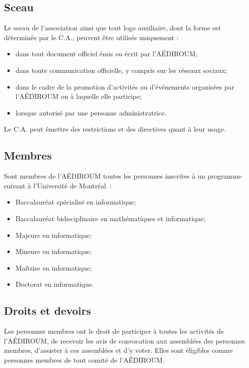 \documentclass{aediroum}
\begin{document}
\subsection{Sceau}\label{sec:sceau}

Le sceau de l'association ainsi que tout logo auxiliaire, dont la forme est déterminée par le C.A., peuvent être utilisés uniquement :

\begin{itemize}
    \item dans tout document officiel émis ou écrit par l'AÉDIROUM;
    \item dans toute communication officielle, y compris sur les réseaux sociaux;
    \item dans le cadre de la promotion d'activités ou d'événements organisées par l'AÉDIROUM ou à laquelle elle participe;
    \item lorsque autorisé par une personne administratrice.
\end{itemize}

Le C.A. peut émettre des restrictions et des directives quant à leur usage.

\subsection{Membres}\label{sec:membres}

Sont membres de l'AÉDIROUM toutes les personnes inscrites à un programme suivant à l'Université de Montréal~:

\begin{itemize}
    \item Baccalauréat spécialisé en informatique;
    \item Baccalauréat bidisciplinaire en mathématiques et informatique;
    \item Majeure en informatique;
    \item Mineure en informatique;
    \item Maîtrise en informatique;
    \item Doctorat en informatique.
\end{itemize}

\subsection{Droits et devoirs}\label{sec:droits-et-devoirs}

Les personnes membres ont le droit de participer à toutes les activités de l'AÉDIROUM, de recevoir les avis de convocation aux assemblées des personnes membres, d'assister à ces assemblées et d'y voter. Elles sont éligibles comme personnes membres de tout comité de l’AÉDIROUM.
\end{document}
